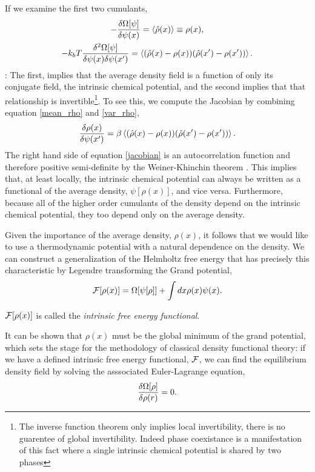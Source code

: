 If we examine the first two cumulants,
%
\begin{gather}
    \label{mean_rho}
    - \frac{\delta \Omega[\psi]}{\delta \psi(x)}
        = \left\langle \hat{\rho}(x) \right\rangle \equiv \rho(x), \\
    \label{var_rho} 
    -k_b T\frac{\delta^2 \Omega[\psi]}{\delta \psi(x) \delta \psi(x^\prime)}
        = \left\langle (\hat{\rho}(x) - \rho(x))
          (\hat{\rho}(x^\prime) - \rho(x^\prime)) \right\rangle.
\end{gather}
%
: The first, implies that the average density field is a function of only its conjugate
field, the intrinsic chemical potential, and the second implies that that
relationship is invertible\footnote{The inverse function theorem only implies
local invertibility, there is no guarentee of global invertibility. Indeed
phase coexistance is a manifestation of this fact where a single intrinsic
chemical potential is shared by two phases}.  To see this, we compute the 
Jacobian by combining equation \ref{mean_rho} and \ref{var_rho},
%
\begin{equation}
    \label{jacobian}
    \frac{\delta \rho(x)}{\delta \psi(x^\prime)} 
        = \beta \left\langle (\hat{\rho}(x) - \rho(x))
        (\hat{\rho}(x^\prime) - \rho(x^\prime)) \right\rangle.
\end{equation}
%
The right hand side of equation \ref{jacobian} is an autocorrelation function
and therefore positive semi-definite by the Weiner-Khinchin theorem . This implies
that, at least locally, the intrinsic chemical potential can always be written
as a functional of the average density, $\psi[\rho(x)]$, and vice versa.
Furthermore, because all of the higher order cumulants of the density depend on
the intrinsic chemical potential, they too depend only on the average density.

Given the importance of the average density, $\rho(x)$, it follows that we would
like to use a thermodynamic potential with a natural dependence on the density.
We can construct a generalization of the Helmholtz free energy that has
precisely this characteristic by Legendre transforming the Grand potential,
%
\begin{equation}
    \mathcal{F}[\rho(x)] = \Omega[\psi[\rho]] + \int dx \rho(x) \psi(x).
    \label{intrinsic_F}
\end{equation}
%

$\mathcal{F}[\rho(x)]$ is called the \textit{intrinsic free energy functional}.

It can be shown \cite{HansenAppendixB} that $\rho(x)$ must be the global minimum
of the grand potential, which sets the stage for the methodology of classical
density functional theory: if we have a defined intrinsic free energy
functional, $\mathcal{F}$, we can find the equilibrium density field by solving the
asssociated Euler-Lagrange equation, 
%
\begin{equation}
    \frac{\delta \Omega[\rho]}{\delta \rho(r)} = 0.
\label{fundamental_CDFT}
\end{equation}
%

